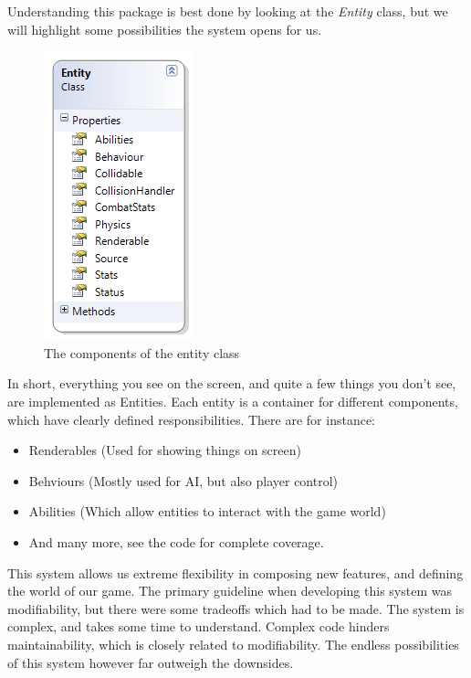 Understanding this package is best done by looking at the \emph{Entity} class,
but we will highlight some possibilities the system opens for us.


\begin{figure}
    \begin{center}
    \includegraphics[scale=1]{graphics/entity}
    \caption{The components of the entity class}
    \label{fig:entity}
    \end{center}
\end{figure}

In short, everything you see on the screen, and quite a few things you don't
see, are implemented as Entities. Each entity is a container for different
components, which have clearly defined responsibilities. There are for 
instance:
\begin{itemize}
    \item Renderables (Used for showing things on screen)
    \item Behviours (Mostly used for AI, but also player control)
    \item Abilities (Which allow entities to interact with the game world)
    \item And many more, see the code for complete coverage.
\end{itemize}

This system allows us extreme flexibility in composing new features, and 
defining the world of our game. The primary guideline when developing this
system was modifiability, but there were some tradeoffs which had to be made.
The system is complex, and takes some time to understand. Complex code hinders
maintainability, which is closely related to modifiability. The endless 
possibilities of this system however far outweigh the downsides.

